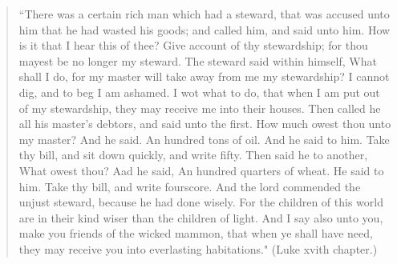 \begin{verse}
``There was a certain rich man which had a steward, that was accused
unto him that he had wasted his goods; and called him, and said unto him. How 
is it that I hear this of thee? Give account of thy stewardship; for thou 
mayest be no longer my steward. The steward said within himself, What shall 
I do, for my master will take away from me my stewardship? I cannot dig, and 
to beg I am ashamed. I wot what to do, that when I am put out of my
stewardship, they may receive me into their houses. Then called he all his master's 
debtors, and said unto the first. How much owest thou unto my master? And 
he said. An hundred tons of oil. And he said to him. Take thy bill, and sit 
down quickly, and write fifty. Then said he to another, What owest thou? 
Aad he said, An hundred quarters of wheat. He said to him. Take thy bill, and 
write fourscore. And the lord commended the unjust steward, because he had 
done wisely. For the children of this world are in their kind wiser than the 
children of light. And I say also unto you, make you friends of the wicked 
mammon, that when ye shall have need, they may receive you into everlasting 
habitations." (Luke xvith chapter.) 
\end{verse}

